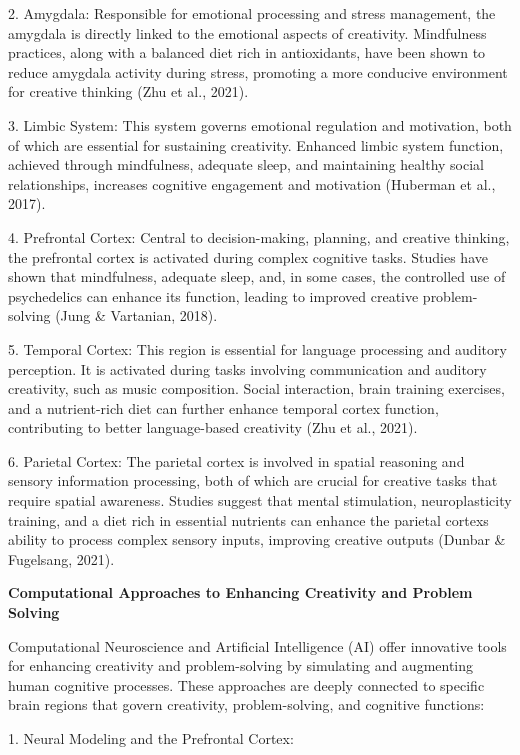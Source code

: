 \documentclass[
]{article}
\begin{document}
2. Amygdala: Responsible for emotional processing and stress management,
the amygdala is directly linked to the emotional aspects of creativity.
Mindfulness practices, along with a balanced diet rich in antioxidants,
have been shown to reduce amygdala activity during stress, promoting a
more conducive environment for creative thinking (Zhu et al., 2021).

3. Limbic System: This system governs emotional regulation and
motivation, both of which are essential for sustaining creativity.
Enhanced limbic system function, achieved through mindfulness, adequate
sleep, and maintaining healthy social relationships, increases cognitive
engagement and motivation (Huberman et al., 2017).

4. Prefrontal Cortex: Central to decision-making, planning, and creative
thinking, the prefrontal cortex is activated during complex cognitive
tasks. Studies have shown that mindfulness, adequate sleep, and, in some
cases, the controlled use of psychedelics can enhance its function,
leading to improved creative problem-solving (Jung \& Vartanian, 2018).

5. Temporal Cortex: This region is essential for language processing and
auditory perception. It is activated during tasks involving
communication and auditory creativity, such as music composition. Social
interaction, brain training exercises, and a nutrient-rich diet can
further enhance temporal cortex function, contributing to better
language-based creativity (Zhu et al., 2021).

6. Parietal Cortex: The parietal cortex is involved in spatial reasoning
and sensory information processing, both of which are crucial for
creative tasks that require spatial awareness. Studies suggest that
mental stimulation, neuroplasticity training, and a diet rich in
essential nutrients can enhance the parietal cortex\textquotesingle s
ability to process complex sensory inputs, improving creative outputs
(Dunbar \& Fugelsang, 2021).

\textbf{Computational Approaches to Enhancing Creativity and Problem
Solving}

Computational Neuroscience and Artificial Intelligence (AI) offer
innovative tools for enhancing creativity and problem-solving by
simulating and augmenting human cognitive processes. These approaches
are deeply connected to specific brain regions that govern creativity,
problem-solving, and cognitive functions:

1. Neural Modeling and the Prefrontal Cortex:
\end{document}
